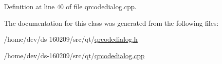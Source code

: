 Definition at line 40 of file qrcodedialog.\+cpp.



The documentation for this class was generated from the following files\+:\begin{DoxyCompactItemize}
\item 
/home/dev/ds-\/160209/src/qt/\hyperlink{qrcodedialog_8h}{qrcodedialog.\+h}\item 
/home/dev/ds-\/160209/src/qt/\hyperlink{qrcodedialog_8cpp}{qrcodedialog.\+cpp}\end{DoxyCompactItemize}
